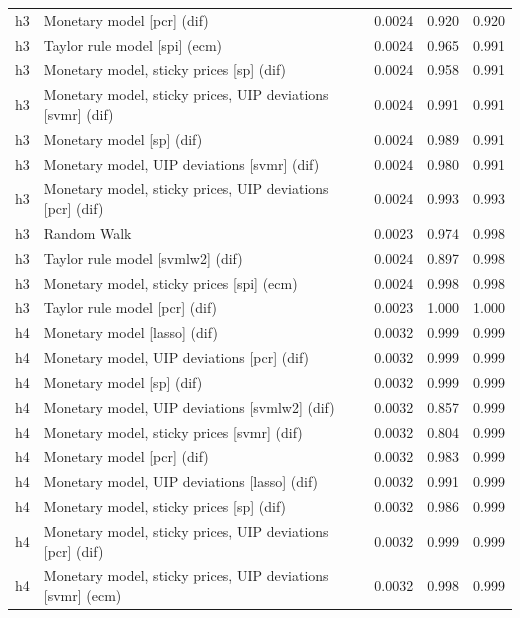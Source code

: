 \begin{ThreePartTable}
\begin{longtable}[t]{cp{5.5cm}ccc}
\addlinespace
h3 & \raggedright Monetary model [pcr] (dif) & 0.0024 & 0.920 & 0.920\\
h3 & \raggedright Taylor rule model [spi] (ecm) & 0.0024 & 0.965 & 0.991\\
h3 & \raggedright Monetary model, sticky prices [sp] (dif) & 0.0024 & 0.958 & 0.991\\
h3 & \raggedright Monetary model, sticky prices, UIP deviations [svmr] (dif) & 0.0024 & 0.991 & 0.991\\
h3 & \raggedright Monetary model [sp] (dif) & 0.0024 & 0.989 & 0.991\\
h3 & \raggedright Monetary model, UIP deviations [svmr] (dif) & 0.0024 & 0.980 & 0.991\\
h3 & \raggedright Monetary model, sticky prices, UIP deviations [pcr] (dif) & 0.0024 & 0.993 & 0.993\\
h3 & \raggedright Random Walk & 0.0023 & 0.974 & 0.998\\
h3 & \raggedright Taylor rule model [svmlw2] (dif) & 0.0024 & 0.897 & 0.998\\
h3 & \raggedright Monetary model, sticky prices [spi] (ecm) & 0.0024 & 0.998 & 0.998\\
h3 & \raggedright Taylor rule model [pcr] (dif) & 0.0023 & 1.000 & 1.000\\
\addlinespace
h4 & \raggedright Monetary model [lasso] (dif) & 0.0032 & 0.999 & 0.999\\
h4 & \raggedright Monetary model, UIP deviations [pcr] (dif) & 0.0032 & 0.999 & 0.999\\
h4 & \raggedright Monetary model [sp] (dif) & 0.0032 & 0.999 & 0.999\\
h4 & \raggedright Monetary model, UIP deviations [svmlw2] (dif) & 0.0032 & 0.857 & 0.999\\
h4 & \raggedright Monetary model, sticky prices [svmr] (dif) & 0.0032 & 0.804 & 0.999\\
h4 & \raggedright Monetary model [pcr] (dif) & 0.0032 & 0.983 & 0.999\\
h4 & \raggedright Monetary model, UIP deviations [lasso] (dif) & 0.0032 & 0.991 & 0.999\\
h4 & \raggedright Monetary model, sticky prices [sp] (dif) & 0.0032 & 0.986 & 0.999\\
h4 & \raggedright Monetary model, sticky prices, UIP deviations [pcr] (dif) & 0.0032 & 0.999 & 0.999\\
h4 & \raggedright Monetary model, sticky prices, UIP deviations [svmr] (ecm) & 0.0032 & 0.998 & 0.999\\

\end{longtable}
\end{ThreePartTable}
